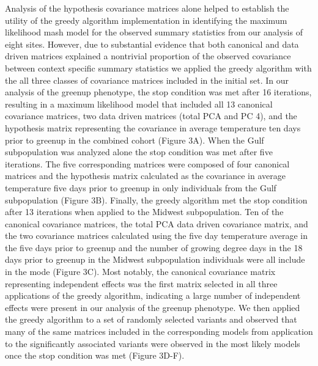 \documentclass[
  letterpaper,
  DIV=11,
  numbers=noendperiod]{scrartcl}
\begin{document}
\hfill\break

Analysis of the hypothesis covariance matrices alone helped to establish
the utility of the greedy algorithm implementation in identifying the
maximum likelihood mash model for the observed summary statistics from
our analysis of eight sites. However, due to substantial evidence that
both canonical and data driven matrices explained a nontrivial
proportion of the observed covariance between context specific summary
statistics we applied the greedy algorithm with the all three classes of
covariance matrices included in the initial set. In our analysis of the
greenup phenotype, the stop condition was met after 16 iterations,
resulting in a maximum likelihood model that included all 13 canonical
covariance matrices, two data driven matrices (total PCA and PC 4), and
the hypothesis matrix representing the covariance in average temperature
ten days prior to greenup in the combined cohort (Figure 3A). When the
Gulf subpopulation was analyzed alone the stop condition was met after
five iterations. The five corresponding matrices were composed of four
canonical matrices and the hypothesis matrix calculated as the
covariance in average temperature five days prior to greenup in only
individuals from the Gulf subpopulation (Figure 3B). Finally, the greedy
algorithm met the stop condition after 13 iterations when applied to the
Midwest subpopulation. Ten of the canonical covariance matrices, the
total PCA data driven covariance matrix, and the two covariance matrices
calculated using the five day temperature average in the five days prior
to greenup and the number of growing degree days in the 18 days prior to
greenup in the Midwest subpopulation individuals were all include in the
mode (Figure 3C). Most notably, the canonical covariance matrix
representing independent effects was the first matrix selected in all
three applications of the greedy algorithm, indicating a large number of
independent effects were present in our analysis of the greenup
phenotype. We then applied the greedy algorithm to a set of randomly
selected variants and observed that many of the same matrices included
in the corresponding models from application to the significantly
associated variants were observed in the most likely models once the
stop condition was met (Figure 3D-F).~

\hfill\break
\end{document}
